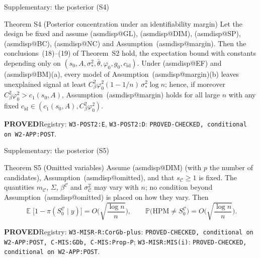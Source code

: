 \documentclass[aspectratio=169]{beamer}
\makeatletter
\newcommand{\asmdisp}[1]{\csname asmdisp@#1\endcsname}
\newcommand{\as}[1]{\textup{(\asmdisp{#1})}}
\DeclareMathOperator{\E}{\mathbb{E}}
\renewcommand{\P}{\mathbb{P}}
\newcommand{\sigs}{\sigma_*}
\newcommand{\Sz}{S_0}
\newcommand{\sz}{s_0}
\newcommand{\HPM}{\mathrm{HPM}}
\newcommand{\rid}[1]{\texttt{#1}}
\makeatother
\begin{document}
\begin{frame}{Supplementary: the posterior (S4)}
\footnotesize
\begin{block}{Theorem S4 (Posterior concentration under an identifiability margin)}
Let the design be fixed and assume \as{GL}, \as{DIM}, \as{SP}, \as{BC}, \as{NC} and Assumption~\as{margin}. Then the
conclusions~\textup{(18)}--\textup{(19)} of Theorem~S2 hold, the expectation bound with
constants depending only on $(\sz,A,\sigs^2,\bar\theta,\varphi_0,g_0,c_{\mathrm{id}})$. Under \as{EF} and \as{BM}(a), every model of Assumption~\as{margin}(b) leaves unexplained signal at least
$C_\beta^2\varphi_0^2(1-1/n)\,\sigs^2\log n$; hence, if moreover $C_\beta^2\varphi_0^2>c_1(\sz,A)$, Assumption~\as{margin}
holds for all large $n$ with any fixed $c_{\mathrm{id}}\in(c_1(\sz,A),C_\beta^2\varphi_0^2)$.
\end{block}
{\footnotesize \textbf{PROVED}\quad Registry: \rid{W3-POST2:E}, \rid{W3-POST2:D}: \rid{PROVED-CHECKED, conditional on W2-APP:POST}.}

\end{frame}

\begin{frame}{Supplementary: the posterior (S5)}
\footnotesize
\begin{block}{Theorem S5 (Omitted variables)}
Assume \as{DIM} (with $p$ the number of candidates), Assumption~\as{omitted}, and that $s_{\mathcal C}\ge1$ is fixed. The
quantities $m_{\mathcal C}$, $\Sigma$, $\beta^{\mathcal C}$ and $\sigma^2_{\mathcal C}$ may vary with $n$; no condition beyond
Assumption~\as{omitted} is placed on how they vary. Then
\[
  \E\big[1-\pi(\Sz^{\mathcal C}\mid y)\big]=O\Big(\sqrt{\frac{\log n}{n}}\Big),\qquad
  \P\big(\HPM\neq\Sz^{\mathcal C}\big)=O\Big(\sqrt{\frac{\log n}{n}}\Big).
\]
\end{block}
{\footnotesize \textbf{PROVED}\quad Registry: \rid{W3-MISR-R:CorGb-plus}: \rid{PROVED-CHECKED, conditional on W2-APP:POST, C-MIS:GDb, C-MIS:Prop-P}; \rid{W3-MISR:MIS(i)}: \rid{PROVED-CHECKED, conditional on W2-APP:POST}.}

\end{frame}
\end{document}
